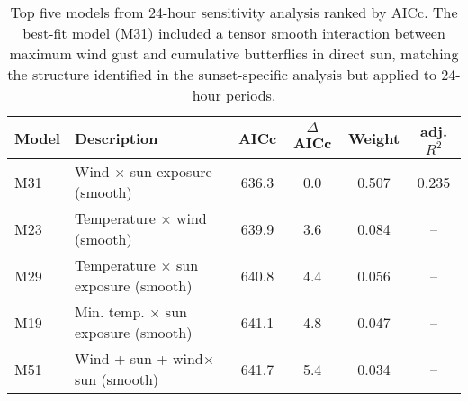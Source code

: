 \begin{table}[htbp]
\centering
\caption{Top five models from 24-hour sensitivity analysis ranked by AICc. The best-fit model (M31) included a tensor smooth interaction between maximum wind gust and cumulative butterflies in direct sun, matching the structure identified in the sunset-specific analysis but applied to 24-hour periods.}
\label{tab:24hr-model-selection-table}
\begin{tabular}{llcccc}
\toprule
Model & Description & AICc & $\Delta$AICc & Weight & adj. $R^2$ \\
\midrule
M31 & Wind $\times$ sun exposure (smooth) & 636.3 & 0.0 & 0.507 & 0.235 \\
M23 & Temperature $\times$ wind (smooth) & 639.9 & 3.6 & 0.084 & -- \\
M29 & Temperature $\times$ sun exposure (smooth) & 640.8 & 4.4 & 0.056 & -- \\
M19 & Min. temp. $\times$ sun exposure (smooth) & 641.1 & 4.8 & 0.047 & -- \\
M51 & Wind + sun + wind$\times$sun (smooth) & 641.7 & 5.4 & 0.034 & -- \\
\bottomrule
\end{tabular}
\end{table}